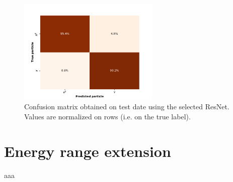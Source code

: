 \begin{figure}
	\centering
	\includegraphics[width=0.6\textwidth]{IMG/Cap6/ResNet-D_ConfMatrix.pdf}
	\caption{Confusion matrix obtained on test date  using the selected ResNet. Values are normalized on rows (i.e. on the true label).}
	\label{fig:ResNet-cm}
\end{figure}

\section{Energy range extension}
aaa